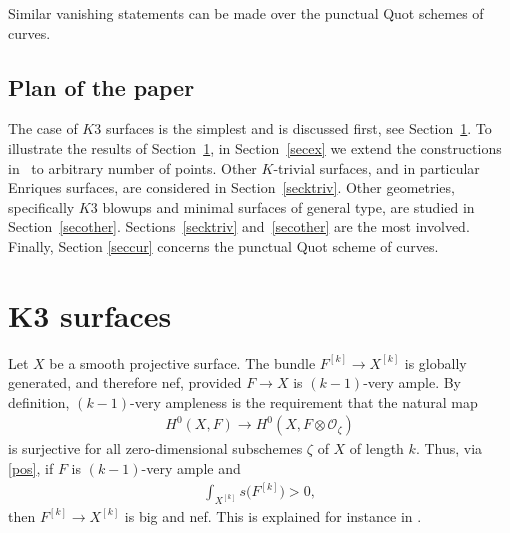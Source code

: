 \documentclass[pdftex]{sigma}
\numberwithin{equation}{section}
\begin{document}
Similar vanishing statements can be made over the punctual Quot schemes of curves.

\subsection{Plan of the paper} The case of $K3$ surfaces is the simplest and is discussed first, see Section~\ref{seck3}. To illustrate the results of Section~\ref{seck3}, in Section~\ref{secex} we extend the constructions in~\cite{BBF} to arbitrary number of points. Other $K$-trivial surfaces, and in particular Enriques surfaces, are considered in Section~\ref{secktriv}. Other geometries, specifically $K3$ blowups and minimal surfaces of general type, are studied in Section~\ref{secother}. Sections~\ref{secktriv} and~\ref{secother} are the most involved. Finally, Section \ref{seccur} concerns the punctual Quot scheme of curves.

\section[K3 surfaces]{$\boldsymbol{K3}$ surfaces} \label{seck3} Let $X$ be a smooth projective surface. The bundle $F^{[k]}\to X^{[k]}$ is globally generated, and therefore nef, provided $F\to X$ is $(k-1)$-very ample. By definition, $(k-1)$-very ampleness is the requirement that the natural map
\begin{gather*}
H^0(X, F)\to H^0(X, F\otimes \mathcal O_{\zeta})
\end{gather*}
is surjective for all zero-dimensional subschemes $\zeta$ of $X$ of length $k$. Thus, via \eqref{pos}, if $F$ is $(k-1)$-very ample and
\begin{gather*}
\int_{X^{[k]}} s\big(F^{[k]}\big)>0,
\end{gather*}
then $F^{[k]}\to X^{[k]}$ is big and nef. This is explained for instance in \cite[Propositions~2.4 and~4.5]{BBF}.
\end{document}
